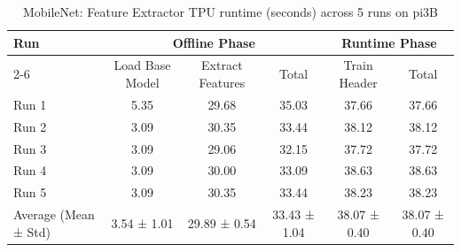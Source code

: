 \begin{table}[t]
\centering
\caption{MobileNet: Feature Extractor TPU runtime (seconds) across 5 runs on pi3B}
\label{tab:runtime_mobilenet_EdgeTPU_pi3B}
\begin{tabular}{lccccc}
\hline
\multirow{2}{*}{Run} & \multicolumn{3}{c}{Offline Phase} & \multicolumn{2}{c}{Runtime Phase} \\
\cline{2-6}
 & Load Base Model & Extract Features & Total & Train Header & Total \\
\hline
  Run 1                  & 5.35           & 29.68          & 35.03          & 37.66          & 37.66          \\
  Run 2                  & 3.09           & 30.35          & 33.44          & 38.12          & 38.12          \\
  Run 3                  & 3.09           & 29.06          & 32.15          & 37.72          & 37.72          \\
  Run 4                  & 3.09           & 30.00          & 33.09          & 38.63          & 38.63          \\
  Run 5                  & 3.09           & 30.35          & 33.44          & 38.23          & 38.23          \\
\hline
  Average (Mean ± Std)   & 3.54 ± 1.01    & 29.89 ± 0.54   & 33.43 ± 1.04   & 38.07 ± 0.40   & 38.07 ± 0.40   \\
\hline
\end{tabular}
\end{table}
